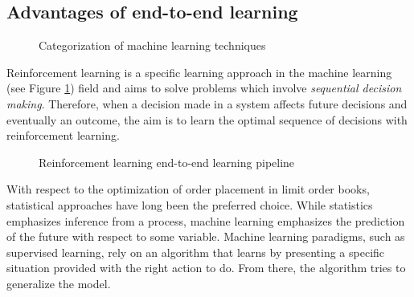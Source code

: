 \subsection{Advantages of end-to-end learning}

\begin{figure}[H]
    \centering
    \caption{Categorization of machine learning techniques}
    \label{fig:ml-rl}
\end{figure}

Reinforcement learning is a specific learning approach in the machine learning (see Figure \ref{fig:ml-rl}) field and aims to solve problems which involve \textit{sequential decision making}.
Therefore, when a decision made in a system affects future decisions and eventually an outcome, the aim is to learn the optimal sequence of decisions with reinforcement learning.

\begin{figure}[H]
    \centering
    \caption{Reinforcement learning end-to-end learning pipeline}
    \label{fig:rl-pipeline}
\end{figure}

With respect to the optimization of order placement in limit order books, statistical approaches have long been the preferred choice.
While statistics emphasizes inference from a process, machine learning emphasizes the prediction of the future with respect to some variable.
Machine learning paradigms, such as supervised learning, rely on an algorithm that learns by presenting a specific situation provided with the right action to do. 
From there, the algorithm tries to generalize the model.

